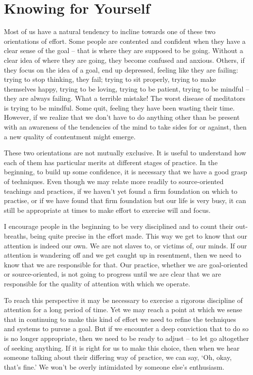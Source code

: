 \section{Knowing for Yourself}

Most of us have a natural tendency to incline towards one of these two
orientations of effort. Some people are contented and confident when
they have a clear sense of the goal -- that is where they are supposed
to be going. Without a clear idea of where they are going, they become
confused and anxious. Others, if they focus on the idea of a goal, end
up depressed, feeling like they are failing: trying to stop thinking,
they fail; trying to sit properly, trying to make themselves happy,
trying to be loving, trying to be patient, trying to be mindful -- they
are always failing. What a terrible mistake! The worst disease of
meditators is trying to be mindful. Some quit, feeling they have been
wasting their time. However, if we realize that we don't have to do
anything other than be present with an awareness of the tendencies of
the mind to take sides for or against, then a new quality of contentment might emerge.

These two orientations are not mutually exclusive. It is useful to
understand how each of them has particular merits at different stages of
practice. In the beginning, to build up some confidence, it is necessary
that we have a good grasp of techniques. Even though we may relate more
readily to source-oriented teachings and practices, if we haven't yet
found a firm foundation on which to practise, or if we have found that
firm foundation but our life is very busy, it can still be appropriate
at times to make effort to exercise will and focus.

I encourage people in the beginning to be very disciplined and to count
their out-breaths, being quite precise in
the effort made. This way we get to know that our attention is indeed
our own. We are not slaves to, or victims of, our minds. If our
attention is wandering off and we get caught up in resentment,
then we need to know that we are responsible for that. Our practice,
whether we are goal-oriented or source-oriented, is not going to
progress until we are clear that we are responsible for the quality of
attention with which we operate.

To reach this perspective it may be necessary to exercise a rigorous
discipline of attention for a long period of time. Yet we may reach a
point at which we sense that in continuing to make this kind of effort
we need to refine the techniques and systems to pursue a goal. But if we
encounter a deep conviction that to do so is no longer appropriate, then
we need to be ready to adjust -- to let go altogether of seeking
anything. If it is right for us to make this choice, then when we hear
someone talking about their differing way of practice, we can say, `Oh,
okay, that's fine.' We won't be overly intimidated by someone else's enthusiasm.

